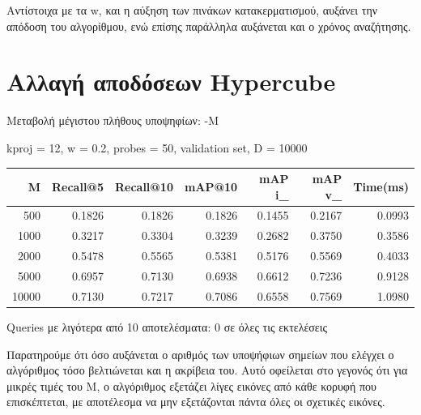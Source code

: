 \documentclass [conference]{IEEEtran}
\begin{document}
Αντίστοιχα με τα w, και η αύξηση των πινάκων κατακερματισμού, αυξάνει την απόδοση του αλγορίθμου, ενώ επίσης παράλληλα αυξάνεται και ο χρόνος αναζήτησης.

\section{Αλλαγή αποδόσεων Hypercube}

Μεταβολή μέγιστου πλήθους υποψηφίων: -M
\begin{table}[H]
    \centering
    \footnotesize
    \setlength{\tabcolsep}{3pt}
    kproj = 12, w = 0.2, probes = 50, validation set, D = 10000
    \par\smallskip
    \begin{tabular}{r r r r r r r}
    \hline
    \textbf{M} & \textbf{Recall@5} & \textbf{Recall@10} & \textbf{mAP@10} & \textbf{mAP i\_} & \textbf{mAP v\_} & \textbf{Time(ms)} \\
    \hline
    500   & 0.1826 & 0.1826 & 0.1826 & 0.1455 & 0.2167 & 0.0993 \\
    1000  & 0.3217 & 0.3304 & 0.3239 & 0.2682 & 0.3750 & 0.3586 \\
    2000  & 0.5478 & 0.5565 & 0.5381 & 0.5176 & 0.5569 & 0.4033 \\
    5000  & 0.6957 & 0.7130 & 0.6938 & 0.6612 & 0.7236 & 0.9128 \\
    10000 & 0.7130 & 0.7217 & 0.7086 & 0.6558 & 0.7569 & 1.0980 \\
    \hline
    \end{tabular}
    \par\smallskip
    \footnotesize Queries με λιγότερα από 10 αποτελέσματα: 0 σε όλες τις εκτελέσεις
\end{table}

Παρατηρούμε ότι όσο αυξάνεται ο αριθμός των υποψήφιων σημείων που ελέγχει ο αλγόριθμος τόσο βελτιώνεται και η ακρίβεια του. Αυτό οφείλεται στο γεγονός ότι για μικρές τιμές του Μ, ο αλγόριθμος εξετάζει λίγες εικόνες από κάθε κορυφή που επισκέπτεται, με αποτέλεσμα να μην εξετάζονται πάντα όλες οι σχετικές εικόνες.
\end{document}
